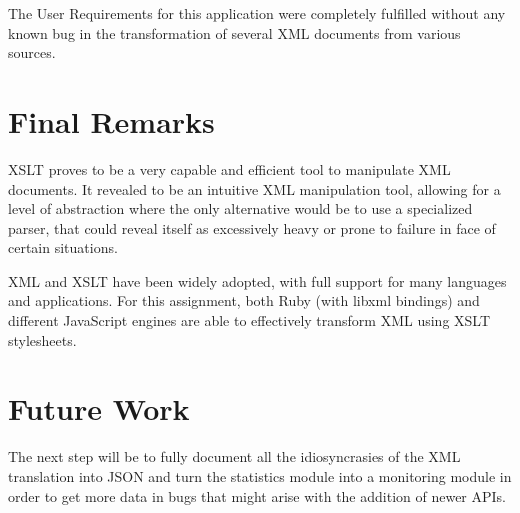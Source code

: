 \documentclass[twocolumn,twoside,10pt,a4paper]{article}
\begin{document}
The User Requirements for this application were completely fulfilled without any known bug in the transformation of several XML documents from various sources.

\section{Final Remarks}\label{sec:final-remarks}

XSLT proves to be a very capable and efficient tool to manipulate XML documents. It revealed to be an intuitive XML manipulation tool, allowing for a level of abstraction where the only alternative would be to use a specialized parser, that could reveal itself as excessively heavy or prone to failure in face of certain situations.

XML and XSLT have been widely adopted, with full support for many languages and applications. For this assignment, both Ruby (with libxml bindings) and different JavaScript engines are able to effectively transform XML using XSLT stylesheets.

\section{Future Work}\label{sec:future-work}

The next step will be to fully document all the idiosyncrasies of the XML translation into JSON and turn the statistics module into a monitoring module in order to get more data in bugs that might arise with the addition of newer APIs.

\renewcommand{\bibname}{References}


\end{document}
